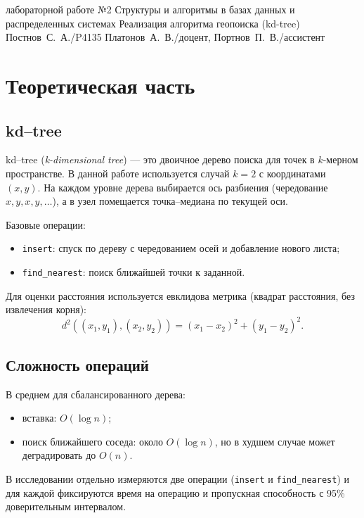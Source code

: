 \documentclass{itmo}
\begin{document}
\makereporttitle{}
	{лабораторной работе №2}
	{Структуры и алгоритмы в базах данных и распределенных системах}
	{Реализация алгоритма геопоиска (kd-tree)}
	{}
	{Постнов~С.~А./P4135}
	{Платонов~А.~В./доцент, Портнов~П.~В./ассистент}

\maketableofcontents

\chapter{Теоретическая часть}

\section{kd--tree}

kd--tree (\textit{k-dimensional tree}) --- это двоичное дерево поиска для точек в $k$-мерном пространстве.
В данной работе используется случай $k=2$ с координатами $(x, y)$.
На каждом уровне дерева выбирается ось разбиения (чередование $x, y, x, y, \ldots$), а в узел помещается точка--медиана по текущей оси.

Базовые операции:
\begin{itemize}
	\item \texttt{insert}: спуск по дереву с чередованием осей и добавление нового листа;
	\item \texttt{find\_nearest}: поиск ближайшей точки к заданной.
\end{itemize}

Для оценки расстояния используется евклидова метрика (квадрат расстояния, без извлечения корня):
$$
d^2((x_1,y_1),(x_2,y_2)) = (x_1-x_2)^2 + (y_1-y_2)^2.
$$

\section{Сложность операций}

В среднем для сбалансированного дерева:
\begin{itemize}
	\item вставка: $O(\log n)$;
	\item поиск ближайшего соседа: около $O(\log n)$, но в худшем случае может деградировать до $O(n)$.
\end{itemize}

В исследовании отдельно измеряются две операции (\texttt{insert} и \texttt{find\_nearest}) и для каждой фиксируются время на операцию и пропускная способность с 95\% доверительным интервалом.
\end{document}
